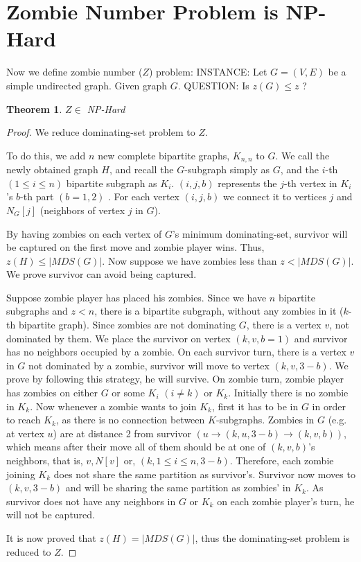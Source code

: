 \documentclass[1p]{elsarticle}
\newtheorem{theorem}{Theorem}
\begin{document}
	
	\section{Zombie Number Problem is NP-Hard}\label{np-zombienumber}

	Now we define zombie number ($Z$) problem:
	{\newline}
	INSTANCE: Let $G = (V,E)$ be a simple undirected graph. Given graph $G$.
	{\newline}
	QUESTION: Is $z(G) \leq z$ ?

	\begin{theorem}
		$Z \in$ NP-Hard
	\end{theorem}
	\begin{proof}
		We reduce dominating-set problem to $Z$.

		To do this, we add $n$ new complete bipartite graphs, $K_{n,n}$ to $G$. We call the newly obtained graph $H$,
		and recall the $G$-subgraph simply as $G$, and the $i$-th $(1 \leq i \leq n)$ bipartite subgraph as $K_i$.
		$(i,j,b)$ represents the $j$-th vertex in $K_i$'s $b$-th part $(b = 1,2)$ . For each vertex $(i,j,b)$ we connect
		it to vertices $j$ and $N_G[j]$ (neighbors of vertex $j$ in $G$).

		By having zombies on each vertex of $G$'s minimum dominating-set, survivor will be captured on the first move and zombie
		player wins. Thus, $z(H) \leq |MDS(G)|$. Now suppose we have zombies less than $z < |MDS(G)|$. We prove survivor can
		avoid being captured.

		Suppose zombie player has placed his zombies. Since we have $n$ bipartite subgraphs and $z < n$, there is a
		bipartite subgraph, without any zombies in it ($k$-th bipartite graph). Since zombies are not dominating $G$,
		there is a vertex $v$, not dominated by them. We place the survivor on vertex $(k,v,b = 1)$ and survivor has no
		neighbors occupied by a zombie. On each survivor turn, there is a vertex $v$ in $G$ not dominated by a zombie,
		survivor will move to vertex $(k,v,3 - b)$. We prove by following this strategy, he will survive. On zombie
		turn, zombie player has zombies on either $G$ or some $K_i$ $(i \neq k)$ or $K_k$. Initially there is no zombie
		in $K_k$. Now whenever a zombie wants to join $K_k$, first it has to be in $G$ in order to reach $K_k$, as there
		is no connection between $K$-subgraphs. Zombies in $G$ (e.g. at vertex $u$) are at distance 2 from survivor $(u
		\rightarrow (k,u,3 - b) \rightarrow (k,v,b))$, which means after their move all of them should be at one of
		$(k,v,b)$'s neighbors, that is, $v , N[v] $ or, $ (k,1 \leq i \leq n,3 - b)$. Therefore, each zombie joining $K_k$ does
		not share the same partition as survivor's. Survivor now moves to $(k,v,3-b)$ and will be sharing the same
		partition as zombies' in $K_k$. As survivor does not have any neighbors in $G$ or $K_k$ on each zombie player's
		turn, he will not be captured.

		It is now proved that $z(H) = |MDS(G)|$, thus the dominating-set problem is reduced to $Z$.

	\end{proof}
\end{document}
